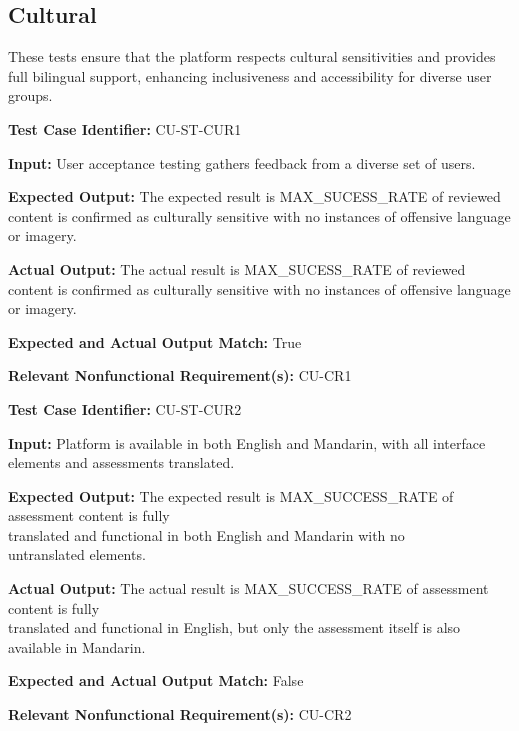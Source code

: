 \documentclass[12pt, titlepage]{article}
\begin{document}
\subsection{Cultural}
\hspace{2em}These tests ensure that the platform respects cultural sensitivities and provides full bilingual support, enhancing inclusiveness and accessibility for diverse user groups.

\begin{mdframed}[linewidth=0.5mm] \par
  \textbf{Test Case Identifier:} CU-ST-CUR1 \par
  \textbf{Input:} User acceptance testing gathers feedback from a diverse set of users. \par
  \textbf{Expected Output:} The expected result is MAX\_SUCESS\_RATE of reviewed content is confirmed as culturally sensitive with no instances of offensive language or imagery. \par
  \textbf{Actual Output:} The actual result is MAX\_SUCESS\_RATE of reviewed content is confirmed as culturally sensitive with no instances of offensive language or imagery. \par
  \textbf{Expected and Actual Output Match:} True \par
  \textbf{Relevant Nonfunctional Requirement(s):} CU-CR1
\end{mdframed}

\begin{mdframed}[linewidth=0.5mm] \par
  \textbf{Test Case Identifier:} CU-ST-CUR2 \par
  \textbf{Input:} Platform is available in both English and Mandarin, with all interface elements and assessments translated. \par
  \textbf{Expected Output:} The expected result is MAX\_SUCCESS\_RATE of assessment content is fully \\translated and functional in both English and Mandarin with no \\untranslated elements. \par
  \textbf{Actual Output:} The actual result is MAX\_SUCCESS\_RATE of assessment content is fully \\translated and functional in English, but only the assessment itself is also available in Mandarin. \par
  \textbf{Expected and Actual Output Match:} False \par
  \textbf{Relevant Nonfunctional Requirement(s):} CU-CR2
\end{mdframed}
\end{document}
